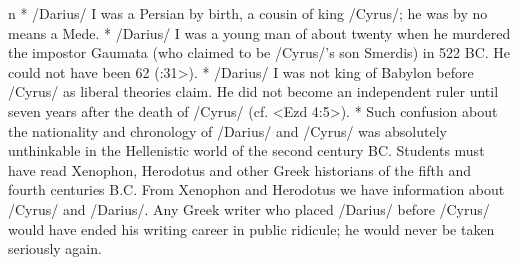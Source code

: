\begitems \style n
* \x/Darius/ I was a Persian by birth, a cousin of king \x/Cyrus/; he was by no means a Mede.
* \x/Darius/ I was a young man of about twenty when he murdered the impostor Gaumata (who claimed to be \x/Cyrus/'s son Smerdis) in 522 BC.  He could not have been 62 (:31>). 
* \x/Darius/ I was not king of Babylon before \x/Cyrus/ as liberal theories claim. He did not become an independent ruler until seven years after the death of \x/Cyrus/ (cf. <Ezd 4:5>).
* Such confusion about the nationality and chronology of \x/Darius/ and \x/Cyrus/ was absolutely unthinkable in the Hellenistic world of the second century BC.
Students must have read Xenophon, Herodotus and other Greek historians of the fifth and fourth centuries B.C. From Xenophon and Herodotus we have information about \x/Cyrus/ and \x/Darius/.
Any Greek writer who placed \x/Darius/ before \x/Cyrus/ would have ended his writing career in public ridicule; he would never be taken seriously again.  
\enditems

